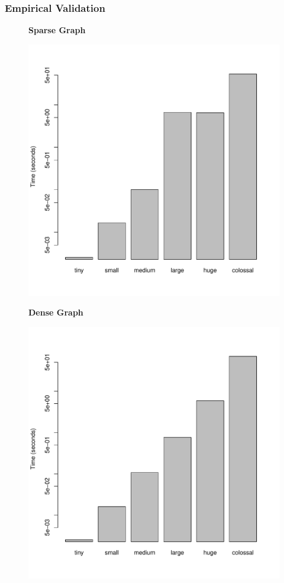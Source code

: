 \documentclass[a4paper,12pt]{article}
\begin{document}
\subsubsection{Empirical Validation}
\begin{figure}[h]
  \centering
  \textbf{Sparse Graph}\par\medskip
  \includegraphics[scale=0.3]{Floyd-Warshallsparse}
\end{figure}
\begin{figure}[h]
  \centering
  \textbf{Dense Graph}\par\medskip
  \includegraphics[scale=0.3]{Floyd-Warshalldense}
\end{figure}
\end{document}
